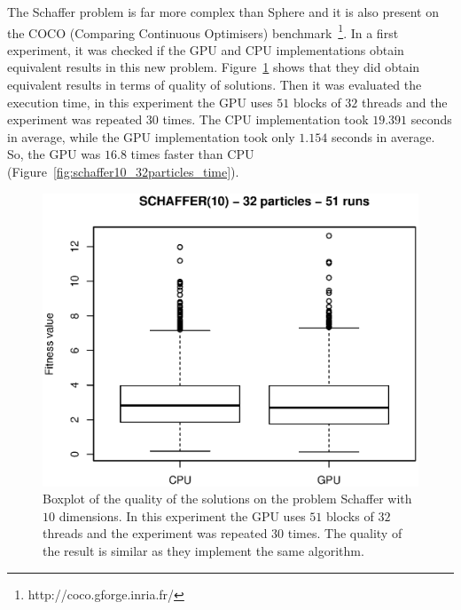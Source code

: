 \documentclass[conference]{IEEEtran}
\begin{document}
    The Schaffer problem is far more complex than Sphere and it is also present on the COCO (Comparing Continuous Optimisers) benchmark~\footnote{http://coco.gforge.inria.fr/}.
    In a first experiment, it was checked if the GPU and CPU implementations obtain equivalent results in this new problem. Figure~\ref{fig:schaffer10_32particles_fitness} shows that they did obtain equivalent results in terms of quality of solutions.
    Then it was evaluated the execution time, in this experiment the GPU uses $51$ blocks of $32$ threads and the experiment was repeated $30$ times. The CPU implementation took $19.391$ seconds in average, while the GPU implementation took only $1.154$ seconds in average. So, the GPU was $16.8$ times faster than CPU (Figure~\ref{fig:schaffer10_32particles_time}).

    \begin{figure}[!htb]
        \centering
        \includegraphics[width=\columnwidth]{../img/schaffer10_32particles_fitness.eps}
        \caption{Boxplot of the quality of the solutions on the problem Schaffer with $10$ dimensions. In this experiment the GPU uses $51$ blocks of $32$ threads and the experiment was repeated $30$ times. The quality of the result is similar as they implement the same algorithm.}
        \label{fig:schaffer10_32particles_fitness}
    \end{figure}
\end{document}
